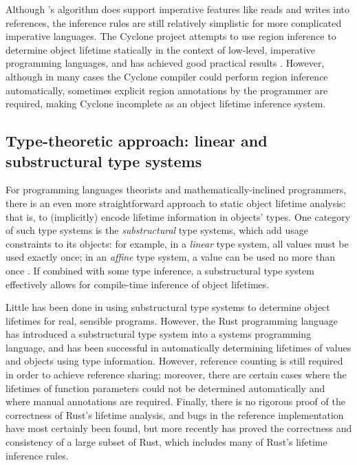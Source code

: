 Although \cite{RegionInference}'s algorithm does support imperative features like reads and writes into references,
the inference rules are still relatively simplistic for more complicated imperative languages. The Cyclone
project attempts to use region inference to determine object lifetime statically in the context of
low-level, imperative programming languages, and has achieved good practical results \citep{Cyclone}. However,
although in many cases the Cyclone compiler could perform region inference automatically, sometimes explicit
region annotations by the programmer are required, making Cyclone incomplete as an object lifetime inference
system.

\subsection{Type-theoretic approach: linear and substructural type systems}
For programming languages theorists and mathematically-inclined programmers, there is an even more straightforward
approach to static object lifetime analysis: that is, to (implicitly) encode lifetime information in objects'
types. One category of such type systems is the \emph{substructural} type systems, which add usage constraints to
its objects: for example, in a \emph{linear} type system, all values must be used exactly once; in an \emph{affine}
type system, a value can be used no more than once \citep{SubstructuralTypes}. If combined with some type
inference, a substructural type system effectively allows for compile-time inference of object lifetimes.

Little has been done in using substructural type systems to determine object lifetimes for real, sensible programs.
However, the Rust programming language \citep{RustLang} has introduced a substructural type system into a systems
programming language, and has been successful in automatically determining lifetimes of values and objects using
type information. However, reference counting is still required in order to achieve reference sharing; moreover, there are
certain cases where the lifetimes of function parameters could not be determined automatically and where manual
annotations are required. Finally, there is no rigorous proof of the correctness of Rust's lifetime analysis, and bugs in the
reference implementation have most certainly been found, but more recently \cite{RustBelt} has proved the correctness and consistency
of a large subset of Rust, which includes many of Rust's lifetime inference rules.

